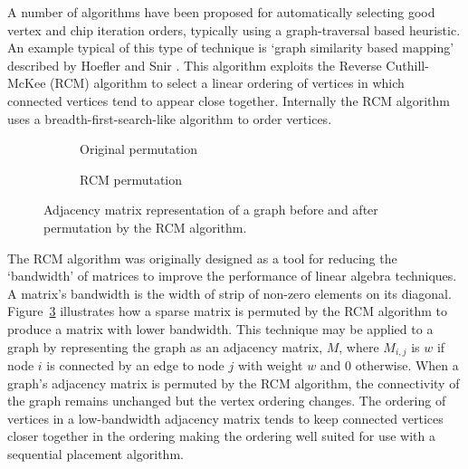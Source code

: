 				A number of algorithms have been proposed for automatically selecting
				good vertex and chip iteration orders, typically using a
				graph-traversal based heuristic. An example typical of this type of
				technique is `graph similarity based mapping' described by Hoefler and
				Snir \cite{hoefler11}. This algorithm exploits the Reverse
				Cuthill-McKee (RCM) algorithm \cite{cuthill69} to select a linear
				ordering of vertices in which connected vertices tend to appear close
				together. Internally the RCM algorithm uses a breadth-first-search-like
				algorithm to order vertices.
				
				\begin{figure}
					\center
					\begin{subfigure}{0.45\linewidth}
						\center
						
						\caption{Original permutation}
						\label{fig:rcm-initial}
					\end{subfigure}
					\begin{subfigure}{0.45\linewidth}
						\center
						
						\caption{RCM permutation}
						\label{fig:rcm-sorted}
					\end{subfigure}
					
					\caption[Graph adjacency matrix before and after RCM permutation.]%
					{Adjacency matrix representation of a graph before and after
					permutation by the RCM algorithm.}
					\label{fig:rcm}
				\end{figure}
				
				The RCM algorithm was originally designed as a tool for reducing the
				`bandwidth' of matrices to improve the performance of linear algebra
				techniques. A matrix's bandwidth is the width of strip of non-zero
				elements on its diagonal. Figure~\ref{fig:rcm} illustrates how a sparse
				matrix is permuted by the RCM algorithm to produce a matrix with lower
				bandwidth. This technique may be applied to a graph by representing the
				graph as an adjacency matrix, $M$, where $M_{i,j}$ is $w$ if node $i$
				is connected by an edge to node $j$ with weight $w$ and 0 otherwise.
				When a graph's adjacency matrix is permuted by the RCM algorithm, the
				connectivity of the graph remains unchanged but the vertex ordering
				changes. The ordering of vertices in a low-bandwidth adjacency matrix
				tends to keep connected vertices closer together in the ordering making
				the ordering well suited for use with a sequential placement algorithm.
				
